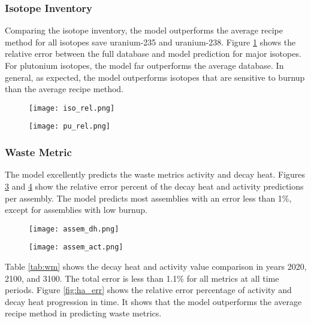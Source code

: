 \subsubsection{Isotope Inventory}

Comparing the isotope inventory, the model outperforms the
average recipe method for all isotopes save uranium-235 and
uranium-238. Figure \ref{fig:iso_rel} shows the relative
error between the full database and model prediction for
major isotopes. For plutonium isotopes, the model far
outperforms the average database. In general, as expected,
the model outperforms isotopes that are sensitive to burnup
than the average recipe method.


\begin{figure}
    \centering
    \texttt{[image: iso\_rel.png]}
    \caption{}
    \label{fig:iso_rel}
\end{figure}


\begin{figure}
    \centering
    \texttt{[image: pu\_rel.png]}
    \caption{}
    \label{fig:pu_rel}
\end{figure}



\subsubsection{Waste Metric}
The model excellently predicts the waste metrics activity
and decay heat. Figures \ref{fig:assem_dh} and \ref{fig:assem_act}
show the relative error percent of the decay heat and activity
predictions per assembly. The model predicts most assemblies
with an error less than 1\%, except for assemblies with low burnup.


\begin{figure}
    \centering
    \texttt{[image: assem\_dh.png]}
    \caption{}
    \label{fig:assem_dh}
\end{figure}


\begin{figure}
    \centering
    \texttt{[image: assem\_act.png]}
    \caption{}
    \label{fig:assem_act}
\end{figure}

Table \ref{tab:wm} shows the decay heat and activity value
comparison in years 2020, 2100, and 3100. The total
error is less than 1.1\% for all metrics at all time periods.
Figure \ref{fig:ha_err} shows the relative error percentage
of activity and decay heat progression in time. It shows
that the model outperforms the average recipe method
in predicting waste metrics.


